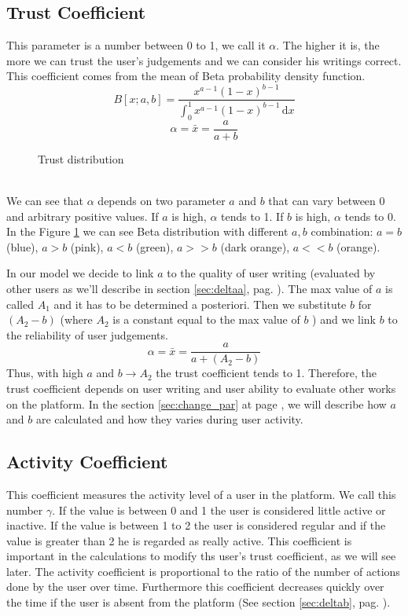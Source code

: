 \documentclass[a4paper,11pt]{article}
\begin{document}
\subsection{Trust Coefficient}
 This parameter is a number between 0 to 1, we call it $
\alpha$. The higher it is, the more we can trust the user's judgements and we can consider 
his writings correct.  This coefficient comes from the mean of Beta probability density 
function.
\begin{equation}
B[x;a,b] = \frac{x^{a-1}\left(1-x\right)^{b-1}}{\displaystyle{\int_0^1 x^{a-1}\left(1-x\right)^{b-1}\, \mathrm{d}x}}
\end{equation}
\begin{equation}
\alpha =\bar{x} = \frac{a}{a+b}
\end{equation}
\begin{figure}[!hpt]
\centering

\caption{Trust distribution}
\label{fig:beta}
\end{figure}
\\ We can see that $\alpha$ depends on two parameter $a$ and $b$ that can vary  between 0 
and arbitrary positive values. If $a$ is high, $\alpha$ tends to 1. If $b$ is high, $
\alpha$ tends to 0. In the Figure \ref{fig:beta} we can see Beta distribution with 
different $a,b$ combination: $a = b$ (blue), $a>b$ (pink), $a<b$ (green), $a>>b$ (dark 
orange), $a<<b$ (orange).

In our model we decide to link $a$ to the quality of user writing (evaluated by other 
users as we'll describe in section \ref{sec:deltaa}, pag. \pageref{sec:deltaa}). The max value of $a$ is called $A_1$ and it has to be determined a posteriori. Then we substitute $b$ for $(A_2 - b)$ (where $A_2$ is a constant equal to the max value of $b$ ) 
and we link $b$ to the reliability of user judgements.
\begin{equation}
\alpha =\bar{x} = \frac{a}{a+\left(A_2 - b\right)}
\end{equation} Thus, with high $a$ and $b \rightarrow A_2$ the 
trust coefficient tends to 1. Therefore, the trust coefficient depends on user writing and 
user ability to evaluate other works on the platform. In the section \ref{sec:change_par} at page \pageref{sec:change_par}, we will describe how $a$ and $b$ are calculated and how they varies during user activity. 

\subsection{Activity Coefficient}
This coefficient measures the activity level of a user in the platform. We call this number $\gamma$. If the value is 
between 0 and 1 the user is considered little active or inactive. If the value is between 
1 to 2 the user is considered regular and if the value is greater than 2 he is regarded as 
really active. This coefficient is important in the calculations to modify ths user's trust 
coefficient, as we will see later.
The activity coefficient is proportional to the ratio of the number of actions done by 
the user over time. Furthermore this coefficient decreases quickly over the time if the user is absent from the platform (See section \ref{sec:deltab}, pag. \pageref{sec:deltab}).
\end{document}
